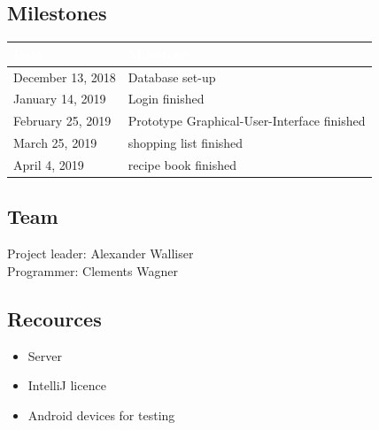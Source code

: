 \documentclass[12pt]{article}
\theoremstyle{definition}
\begin{document}
\subsection{Milestones}
\begin{tabular}{|l|l|}
\hline
\cellcolor[gray]{0.5}\textcolor{white}{Date} &
\cellcolor[gray]{0.5}\textcolor{white}{Milestone} \\ \hline
December 13, 2018 & Database set-up \\ \hline
January 14, 2019 & Login finished \\ \hline
February 25, 2019 & Prototype Graphical-User-Interface finished \\ \hline
March 25, 2019 & shopping list finished \\ \hline
April 4, 2019 & recipe book finished \\ \hline
\end{tabular}

\subsection{Team}
Project leader: Alexander Walliser \\
Programmer: Clements Wagner
\subsection{Recources}
\begin{itemize}
\item Server
\item IntelliJ licence
\item Android devices for testing
\end{itemize}
\end{document}

